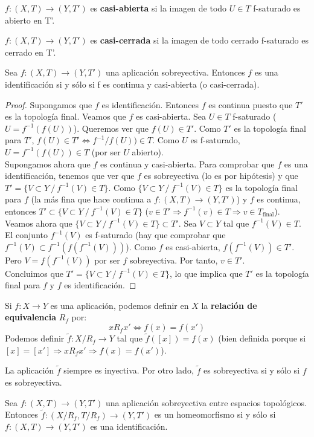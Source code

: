 \begin{ndef}
  $f:(X,T) \to (Y,T')$ es \textbf{casi-abierta} si la imagen de todo $U \in T$ f-saturado es abierto en T'.
\end{ndef}
\begin{ndef}
  $f:(X,T) \to (Y,T')$ es \textbf{casi-cerrada} si la imagen de todo cerrado f-saturado es cerrado en T'.
\end{ndef}
\begin{nprop}
  Sea $f:(X,T) \to (Y,T')$ una aplicación sobreyectiva. Entonces $f$ es una identificación si y sólo si f es continua y casi-abierta (o casi-cerrada).
\end{nprop}
\begin{proof}
    \fbox{$\Rightarrow$} Supongamos que $f$ es identificación. Entonces $f$ es continua puesto que $T'$ es la topología final. Veamos que $f$ es casi-abierta. Sea $U \in T$ f-saturado ($U=f^{-1}(f(U))$). Queremos ver que $f(U) \in T'$. Como $T'$ es la topología final para $T'$, $f(U) \in T' \Leftrightarrow f^{-1}/f(U)) \in T$. Como $U$ es f-saturado, $U=f^{-1}(f(U)) \in T$ (por ser $U$ abierto). \\
    \fbox{$\Leftarrow$} Supongamos ahora que $f$ es continua y casi-abierta. Para comprobar que $f$ es una identificación, tenemos que ver que $f$ es sobreyectiva (lo es por hipótesis) y que $T'=\{V \subset Y \ /\ f^{-1}(V) \in T\}$. Como $\{V \subset Y \ /\ f^{-1}(V) \in T\}$ es la topología final para $f$ (la más fina que hace continua a $f:(X,T) \to (Y,T')$) y $f$ es continua, entonces $T' \subset \{V \subset Y \ /\ f^{-1}(V) \in T\}$ ($v \in T' \Rightarrow f^{-1}(v) \in T \Rightarrow v \in T_{\text{final}}$). Veamos ahora que $\{V \subset Y \ /\ f^{-1}(V) \in T\} \subset T'$. Sea $V \subset Y$ tal que $f^{-1}(V) \in T$. El conjunto $f^{-1}(V)$ es f-saturado (hay que comprobar que $f^{-1}(V) \subset f^{-1}(f(f^{-1}(V)))$). Como $f$ es casi-abierta, $f(f^{-1}(V)) \in T'$. Pero $V=f(f^{-1}(V))$ por ser $f$ sobreyectiva. Por tanto, $v \in T'$. \\
    Concluimos que $T'=\{V \subset Y \ /\ f^{-1}(V) \in T\}$, lo que implica que $T'$ es la topología final para $f$ y $f$ es identificación.
\end{proof}

\begin{ndef}
  Si $f:X \to Y$ es una aplicación, podemos definir en $X$ la \textbf{relación de equivalencia} $R_f$ por:
  \[xR_fx' \Longleftrightarrow f(x) = f(x')\]
  Podemos definir $\tilde{f}:X/R_f \to Y$ tal que $\tilde{f}([x]) = f(x)$ (bien definida porque si $[x] = [x'] \Rightarrow xR_fx' \Rightarrow f(x)=f(x')$).
\end{ndef}
La aplicación $\tilde{f}$ siempre es inyectiva. Por otro lado, $\tilde{f}$ es sobreyectiva si y sólo si $f$ es sobreyectiva.
\begin{nth}
  Sea $f:(X,T) \to (Y,T')$ una aplicación sobreyectiva entre espacios topológicos. Entonces $\tilde{f}:(X/R_f,T/R_f) \to (Y,T')$ es un homeomorfismo si y sólo si $f:(X,T) \to (Y,T')$ es una identificación.
\end{nth}

